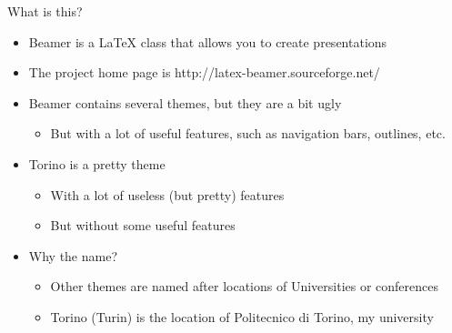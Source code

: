 
\begin{frame}[t,plain]
\titlepage
\end{frame}

\begin{frame}[t]{What is this?}
\begin{itemize}
\item Beamer is a \LaTeX{} class that allows you to create presentations
\item The project home page is http://latex-beamer.sourceforge.net/
\item Beamer contains several themes, but they are a bit ugly
  \begin{itemize}
  \item But with a lot of useful features, such as navigation bars, outlines,
        etc.
  \end{itemize}
\item Torino is a pretty theme
  \begin{itemize}
  \item With a lot of useless (but pretty) features
  \item But without some useful features
  \end{itemize}
\item Why the name?
  \begin{itemize}
  \item Other themes are named after locations of Universities or conferences
  \item Torino (Turin) is the location of Politecnico di Torino, my university
  \end{itemize}
\end{itemize}
\end{frame}

